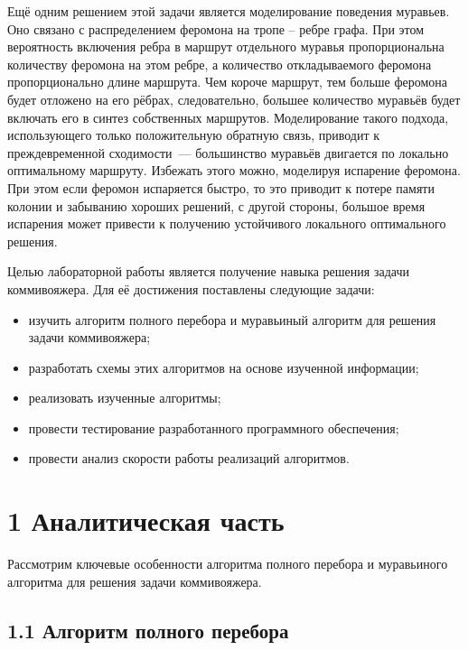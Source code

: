 \documentclass[12pt, a4paper]{report}
\begin{document}
	Ещё одним решением этой задачи является моделирование поведения муравьев. Оно связано с распределением феромона на тропе – ребре графа. При этом вероятность включения ребра в маршрут отдельного муравья пропорциональна 
	количеству феромона на этом ребре, а количество откладываемого феромона пропорционально длине 
	маршрута. Чем короче  маршрут, тем больше феромона будет отложено на его рёбрах, следовательно, большее 
	количество муравьёв будет включать его в синтез собственных маршрутов. Моделирование такого подхода, 
	использующего только положительную обратную связь, приводит к преждевременной сходимости~--- большинство муравьёв двигается по локально оптимальному маршруту. Избежать этого можно, моделируя 
	испарение феромона. При этом если феромон испаряется быстро, то это 
	приводит к потере памяти колонии и забыванию хороших решений, с другой стороны, большое время 
	испарения может привести к получению устойчивого локального оптимального решения. 
	
	Целью лабораторной работы является получение навыка решения задачи коммивояжера. Для её достижения поставлены следующие задачи:
	
	\begin{itemize}
		\item изучить алгоритм полного перебора и муравьиный алгоритм для решения задачи коммивояжера;
		\item разработать схемы этих алгоритмов на основе изученной информации;
		\item реализовать изученные алгоритмы;
		\item провести тестирование разработанного программного обеспечения;
		\item провести анализ скорости работы реализаций алгоритмов.
	\end{itemize}
	
	\newpage
	\chapter*{1 Аналитическая часть}
	
	Рассмотрим ключевые особенности алгоритма полного перебора и муравьиного алгоритма для решения задачи коммивояжера.
	
	\section*{1.1 Алгоритм полного перебора}
	
\end{document}
